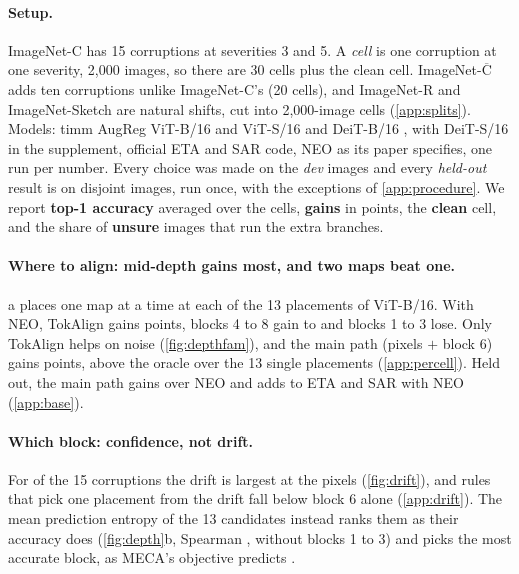 \documentclass{article}
\newcommand{\tok}{TokAlign}
\newcommand{\neo}{NEO}
\begin{document}
\paragraph{Setup.} ImageNet-C \citep{imagenetc2019} has 15 corruptions at severities 3 and 5. A \emph{cell} is one corruption at one severity, 2{,}000 images, so there are 30 cells plus the clean cell. ImageNet-$\overline{\text{C}}$ \citep{mintun2021} adds ten corruptions unlike ImageNet-C's (20 cells), and ImageNet-R \citep{imagenetr2021} and ImageNet-Sketch \citep{sketch2019} are natural shifts, cut into 2{,}000-image cells (\cref{app:splits}). Models: timm AugReg ViT-B/16 and ViT-S/16 \citep{augreg2022,timm} and DeiT-B/16 \citep{deit2021}, with DeiT-S/16 in the supplement, official ETA and SAR code, \neo{} as its paper specifies, one run per number. Every choice was made on the \emph{dev} images and every \emph{held-out} result is on disjoint images, run once, with the exceptions of \cref{app:procedure}. We report \textbf{top-1 accuracy} averaged over the cells, \textbf{gains} in points, the \textbf{clean} cell, and the share of \textbf{unsure} images that run the extra branches.

\paragraph{Where to align: mid-depth gains most, and two maps beat one.} a places one map at a time at each of the 13 placements of ViT-B/16. With \neo{}, \tok{} gains  points, blocks 4 to 8 gain  to  and blocks 1 to 3 lose. Only \tok{} helps on noise (\cref{fig:depthfam}), and the main path (pixels $+$ block 6) gains  points, above the oracle over the 13 single placements (\cref{app:percell}). Held out, the main path gains  over \neo{} and adds to ETA and SAR with \neo{} (\cref{app:base}).

\paragraph{Which block: confidence, not drift.} For  of the 15 corruptions the drift is largest at the pixels (\cref{fig:drift}), and rules that pick one placement from the drift fall below block 6 alone (\cref{app:drift}). The mean prediction entropy of the 13 candidates instead ranks them as their accuracy does (\cref{fig:depth}b, Spearman ,  without blocks 1 to 3) and picks the most accurate block, as MECA's objective predicts \citep{meca2018}.
\end{document}
